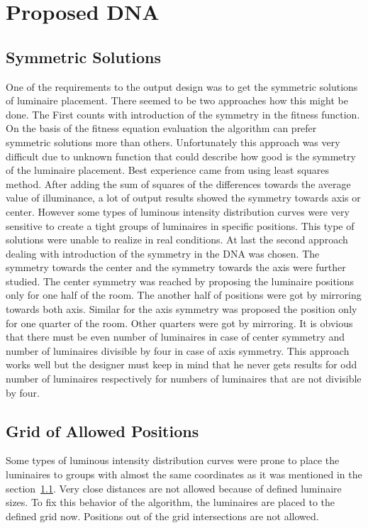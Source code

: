 \section{Proposed DNA}
\subsection{Symmetric Solutions}
\label{ssec:symmetry}
One of the requirements to the output design was to get the symmetric solutions of luminaire placement. There seemed to be two approaches how this might be done. The First counts with introduction of the symmetry in the fitness function. On the basis of the fitness equation evaluation the algorithm can prefer symmetric solutions more than others. Unfortunately this approach was very difficult due to unknown function that could describe how good is the symmetry of the luminaire placement. Best experience came from using least squares method. After adding the sum of squares of the differences towards the average value of illuminance, a lot of output results showed the symmetry towards axis or center. However some types of luminous intensity distribution curves were very sensitive to create a tight groups of luminaires in specific positions. This type of solutions were unable to realize in real conditions.
At last the second approach dealing with introduction of the symmetry in the DNA was chosen. The symmetry towards the center and the symmetry towards the axis were further studied. The center symmetry was reached by proposing the luminaire positions only for one half of the room. The another half of positions were got by mirroring towards both axis. Similar for the axis symmetry was proposed the position only for one quarter of the room. Other quarters were got by mirroring. It is obvious that there must be even number of luminaires in case of center symmetry and number of luminaires divisible by four in case of axis symmetry. This approach works well but the designer must keep in mind that he never gets results for odd number of luminaires respectively for numbers of luminaires that are not divisible by four.

\subsection{Grid of Allowed Positions}
\label{ssec:grid}
Some types of luminous intensity distribution curves were prone to place the luminaires to groups with almost the same coordinates as it was mentioned in the section~\ref{ssec:symmetry}. Very close distances are not allowed because of defined luminaire sizes. To fix this behavior of the algorithm, the luminaires are placed to the defined grid now. Positions out of the grid intersections are not allowed.

